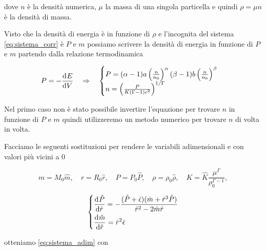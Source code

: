 \documentclass[a4paper, titlepage]{article}
\begin{document}
dove $n$ è la densità numerica, $\mu$ la massa di una singola particella e quindi $\rho = \mu n$ è la densità di massa.


Visto che la densità di energia è in funzione di $\rho$ e l'incognita del sistema \ref{eq:sistema_corr} è $P$ e $m$ possiamo scrivere la densità di energia in funzione di $P$ e $m$ partendo dalla relazione termodinamica

\begin{equation}
    P = - \dv[]{E}{V} \quad \Rightarrow \quad
    \begin{cases}
        P = (\alpha - 1) a \left( \frac{n}{n_0} \right)^{\alpha} (\beta - 1) b \left( \frac{n}{n_0} \right)^{\beta} \\
        n = \left( \frac{P}{K(\Gamma - 1) c^2} \right) ^ {1 / \Gamma}
    \end{cases}
\end{equation}

Nel primo caso non è stato possibile invertire l'equazione per trovare $n$ in funzione di $P$ e $m$ quindi utilizzeremo un metodo numerico per trovare $n$ di volta in volta.


Facciamo le seguenti sostituzioni per rendere le variabili adimensionali e con valori più vicini a 0

\begin{equation*}
    m=M_0\hat{m}, \quad 
    r=R_0\hat{r}, \quad 
    P=P_0\hat{P}, \quad
    \rho=\rho_0 \hat{\rho}, \quad
    K = \hat{K}\frac{\mu^\Gamma}{\rho_0^{\Gamma-1}},
\end{equation*}

\begin{equation}
    \begin{dcases}
        \dv[]{\hat{P}}{\hat{r}}=-\frac{(\hat{P}+\hat{\epsilon})(\hat{m}+\hat{r}^3\hat{P})}{\hat{r}^2-2\hat{m}\hat{r}}\\
        \dv[]{\hat{m}}{\hat{r}}= \hat{r}^2 \hat{\epsilon}
    \end{dcases}
    \label{eq:sistema_adim}
\end{equation}

otteniamo \ref{eq:sistema_adim} con
\end{document}
